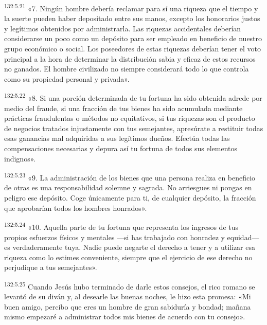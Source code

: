 \par
\textsuperscript{132:5.21} «7. Ningún hombre debería reclamar para sí una riqueza que el tiempo y la suerte pueden haber depositado entre sus manos, excepto los honorarios justos y legítimos obtenidos por administrarla. Las riquezas accidentales deberían considerarse un poco como un depósito para ser empleado en beneficio de nuestro grupo económico o social. Los poseedores de estas riquezas deberían tener el voto principal a la hora de determinar la distribución sabia y eficaz de estos recursos no ganados. El hombre civilizado no siempre considerará todo lo que controla como su propiedad personal y privada».

\par
\textsuperscript{132:5.22} «8. Si una porción determinada de tu fortuna ha sido obtenida adrede por medio del fraude, si una fracción de tus bienes ha sido acumulada mediante prácticas fraudulentas o métodos no equitativos, si tus riquezas son el producto de negocios tratados injustamente con tus semejantes, apresúrate a restituir todas esas ganancias mal adquiridas a sus legítimos dueños. Efectúa todas las compensaciones necesarias y depura así tu fortuna de todos sus elementos indignos».

\par
\textsuperscript{132:5.23} «9. La administración de los bienes que una persona realiza en beneficio de otras es una responsabilidad solemne y sagrada. No arriesgues ni pongas en peligro ese depósito. Coge únicamente para ti, de cualquier depósito, la fracción que aprobarían todos los hombres honrados».

\par
\textsuperscript{132:5.24} «10. Aquella parte de tu fortuna que representa los ingresos de tus propios esfuerzos físicos y mentales ---si has trabajado con honradez y equidad--- es verdaderamente tuya. Nadie puede negarte el derecho a tener y a utilizar esa riqueza como lo estimes conveniente, siempre que el ejercicio de ese derecho no perjudique a tus semejantes».

\par
\textsuperscript{132:5.25} Cuando Jesús hubo terminado de darle estos consejos, el rico romano se levantó de su diván y, al desearle las buenas noches, le hizo esta promesa: «Mi buen amigo, percibo que eres un hombre de gran sabiduría y bondad; mañana mismo empezaré a administrar todos mis bienes de acuerdo con tu consejo».

